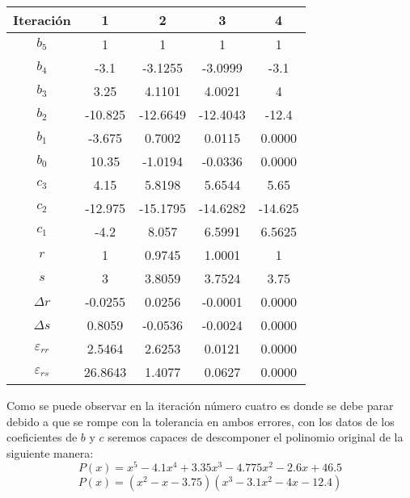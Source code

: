 \documentclass{article}
\begin{document}
\begin{figure*}[h!]
   \centering
   \resizebox{9cm}{!} {
   \begin{tabular}{|c|c|c|c|c|}
       \hline
       Iteración   &   1   &   2   &   3   &   4   \\  \hline
       $b_5$   &   1   &   1   &   1   &   1   \\  \hline
       $b_4$   &   -3.1    &   -3.1255 &   -3.0999 &   -3.1    \\  \hline
       $b_3$   &   3.25    &   4.1101  &   4.0021  &   4   \\  \hline
       $b_2$   &   -10.825 &   -12.6649    &   -12.4043    &   -12.4   \\  \hline
       $b_1$   &   -3.675  &   0.7002  &   0.0115  &   0.0000  \\  \hline
       $b_0$   &   10.35   &   -1.0194 &   -0.0336 &   0.0000  \\  \hline
       $c_3$   &   4.15    &   5.8198  &   5.6544  &   5.65    \\  \hline
       $c_2$   &   -12.975 &   -15.1795    &   -14.6282    &   -14.625 \\  \hline
       $c_1$   &   -4.2    &   8.057   &   6.5991  &   6.5625  \\  \hline
       $r$     &   1   &   0.9745  &   1.0001  &   1   \\  \hline
       $s$     &   3   &   3.8059  &   3.7524  &   3.75    \\  \hline
       $\varDelta r$   &   -0.0255 &   0.0256  &   -0.0001 &   0.0000  \\  \hline
       $\varDelta s$   &   0.8059  &   -0.0536 &   -0.0024 &   0.0000  \\  \hline
       $\varepsilon_{rr}$  &   2.5464  &   2.6253  &   0.0121  &   0.0000  \\  \hline
       $\varepsilon_{rs}$  &   26.8643 &   1.4077  &   0.0627  &   0.0000  \\  \hline
   \end{tabular}
   }
\end{figure*}




Como se puede observar en la iteración número cuatro es donde se debe parar debido a que
se rompe con la tolerancia en ambos errores, con los datos de los coeficientes de $b$ y $c$
seremos capaces de descomponer el polinomio original de la siguiente manera:
\begin{equation*}
   P(x) = x^5 -4.1x^4 + 3.35x^3 -4.775x^2 -2.6x +46.5
\end{equation*}
\begin{equation*}
   P(x) = (x^2 - x -3.75)(x^3-3.1x^2-4x-12.4)
\end{equation*}
\end{document}
